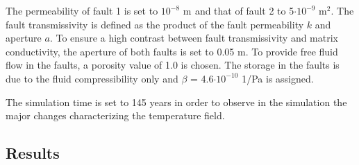 The permeability of fault 1 is set to $10^{-8}$ m$^{}$ and that of fault 2 to 5$\cdot10^{-9}$ m$^{2}$. The fault transmissivity is defined as the product of the fault permeability $k$ and aperture $a$. To ensure a high contrast between fault transmissivity and matrix conductivity, the aperture of both faults is set to 0.05 m. To provide free fluid flow in the faults, a porosity value of 1.0 is chosen. The storage in the faults is due to the fluid compressibility only and $\beta{}$  = 4.6$\cdot10^{-10}$ 1/Pa is assigned.

The simulation time is set to 145 years in order to observe in the simulation the major changes characterizing the temperature field. 

\subsection{Results}
\label{sec:results}

